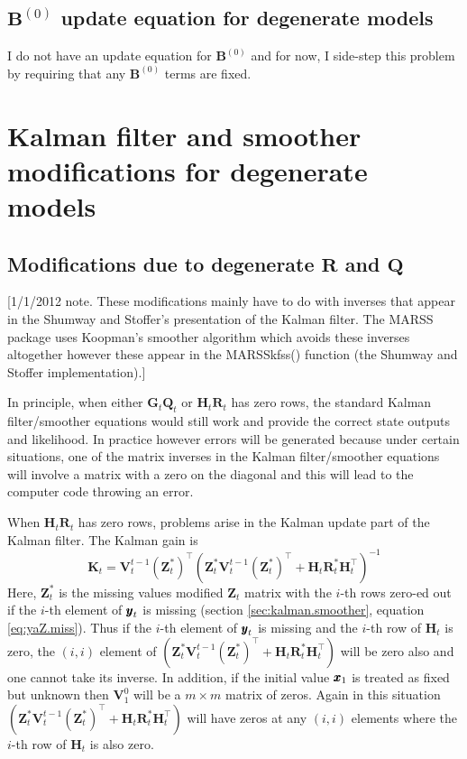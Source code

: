\documentclass[]{article}
\def\UPS{\mbox{\boldmath $\Upsilon$}}
\def\XI{\mbox{\boldmath $\Xi$}}
\def\BB{\mbox{$\mathbf B$}}	\def\bb{\mbox{$\mathbf b$}} \def\Bb{\mbox{$\mathbf J$}} \def\Ba{\mbox{$\mathbf L$}} \def\Bm{\UPS}
\def\GG{\mbox{$\mathbf G$}}	\def\gg{\mbox{$\mathbf g$}}
\def\HH{\mbox{$\mathbf H$}}	\def\hh{\mbox{$\mathbf h$}}
\def\KK{\mbox{$\mathbf K$}}
\def\QQ{\mbox{$\mathbf Q$}}	 \def\qq{\mbox{$\mathbf q$}} \def\Qb{\mbox{$\mathbf G$}}  \def\Qm{\mathbb{Q}}
\def\RR{\mbox{$\mathbf R$}}	 \def\rr{\mbox{$\mathbf r$}} \def\Rb{\mbox{$\mathbf H$}}	\def\Rm{\mathbb{R}}
\def\VV{\mbox{$\mathbf V$}}	\def\vv{\mbox{$\mathbf v$}}
\def\ZZ{\mbox{$\mathbf Z$}}	\def\zz{\mbox{$\mathbf z$}}	\def\Zb{\mbox{$\mathbf M$}} \def\Za{\mbox{$\mathbf N$}} \def\Zm{\XI}
\begin{document}
\subsection{$\BB^{(0)}$ update equation for degenerate models}
I do not have an update equation for $\BB^{(0)}$ and for now, I side-step this problem by requiring that any $\BB^{(0)}$ terms are fixed.

\section{Kalman filter and smoother modifications for degenerate models}

\subsection{Modifications due to degenerate $\RR$ and $\QQ$}
[1/1/2012 note.  These modifications mainly have to do with inverses that appear in the Shumway and Stoffer's presentation of the Kalman filter.  The MARSS package uses Koopman's smoother algorithm which avoids these inverses altogether however these appear in the MARSSkfss() function (the Shumway and Stoffer implementation).]

In principle, when either $\GG_t\QQ_t$ or $\HH_t\RR_t$ has zero rows, the standard Kalman filter/smoother equations would still work and provide the correct state outputs and likelihood.  In practice however errors will be generated because under certain situations, one of the matrix inverses in the Kalman filter/smoother equations will involve a matrix with a zero on the diagonal and this will lead to the computer code throwing an error.  

When $\HH_t\RR_t$ has zero rows, problems arise in the Kalman update part of the Kalman filter.  
The Kalman gain is 
\begin{equation}\label{eq:KKt.2}
\KK_t = \VV_t^{t-1}(\ZZ_t^*)^\top(\ZZ_t^*\VV_t^{t-1}(\ZZ_t^*)^\top + \HH_t\RR_t^*\HH_t^\top)^{-1}
\end{equation}
Here, $\ZZ_t^*$ is the missing values modified $\ZZ_t$ matrix with the $i$-th rows zero-ed out if the $i$-th element of $\mbox{$\pmb{y}$}_t$ is missing (section \ref{sec:kalman.smoother}, equation \ref{eq:yaZ.miss}).  Thus if the $i$-th element of $\mbox{$\pmb{y}$}_t$ is missing and the $i$-th row of $\HH_t$ is zero, the $(i,i)$ element of $(\ZZ_t^*\VV_t^{t-1}(\ZZ_t^*)^\top + \HH_t\RR_t^*\HH_t^\top)$ will be zero also and one cannot take its inverse.  In addition, if the initial value $\mbox{$\pmb{x}$}_1$ is treated as fixed but unknown then $\VV_1^0$ will be a $m \times m$ matrix of zeros.  Again in this situation $(\ZZ_t^*\VV_t^{t-1}(\ZZ_t^*)^\top + \HH_t\RR_t^*\HH_t^\top)$ will have zeros at any $(i,i)$ elements where the $i$-th row of $\HH_t$ is also zero.
\end{document}
